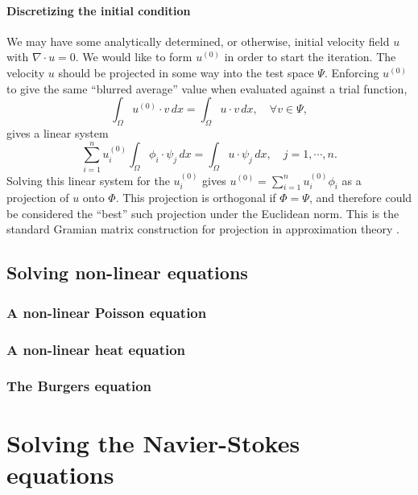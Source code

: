 \documentclass[11pt,a4paper]{memoir}
\newcommand{\om}{{\Omega}}
\begin{document}
\subsubsection{Discretizing the initial condition}
We may have some analytically determined, or otherwise, initial velocity field $u$ with $\nabla\cdot u = 0$.
We would like to form $u^{(0)}$ in order to start the iteration. The velocity $u$ should be projected in some way into the test space $\Psi$.
Enforcing $u^{(0)}$ to give the same ``blurred average'' value when evaluated against a trial function,
\begin{equation}\label{initial_velocity_projection}
    \int_\om u^{(0)}\cdot v\,dx = \int_\om u \cdot v\,dx,\quad \forall v \in \Psi,
\end{equation}
gives a linear system
\begin{equation}\label{initial_velocity_projection_linear_system}
    \sum_{i=1}^n u^{(0)}_i \int_\om \phi_i \cdot \psi_j\,dx = \int_\om u\cdot \psi_j\,dx,
    \quad j=1,\cdots,n.
\end{equation}
Solving this linear system for the $u^{(0)}_i$ gives $u^{(0)} = \sum_{i=1}^n u^{(0)}_i \phi_i$ as a projection of $u$ onto $\Phi$.
This projection is orthogonal if $\Phi = \Psi$, and therefore could be considered the ``best'' such projection under the Euclidean norm.
This is the standard Gramian matrix construction for projection in approximation theory \cite{approximation_theory}.


\section{Solving non-linear equations}
\subsection{A non-linear Poisson equation}
\subsection{A non-linear heat equation}
\subsection{The Burgers equation}


\chapter{Solving the Navier-Stokes equations}
\end{document}
